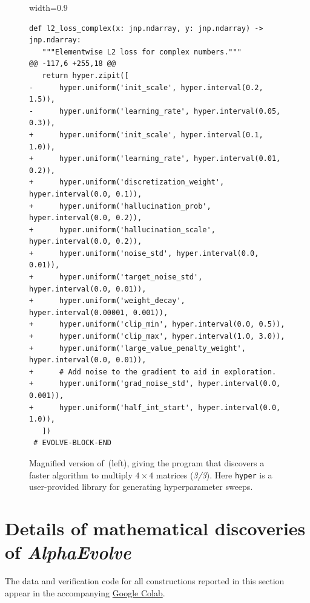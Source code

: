 \documentclass[logo,copyright,12pt]{googledeepmind}
\theoremstyle{definition}
\theoremstyle{remark}
\theoremstyle{plain}
\newcommand{\ResultsColabURL}{https://colab.research.google.com/github/google-deepmind/alphaevolve\_results/blob/master/mathematical\_results.ipynb}
\newcommand{\ResultsColab}{the accompanying \href{\ResultsColabURL}{Google Colab}}
\newcommand{\method}{\emph{AlphaEvolve}\xspace}
\begin{document}
\begin{figure}[p]
\begin{adjustbox}{width=0.9\textwidth}
\begin{minipage}{0.9\textwidth}
\begin{lstlisting}[style=pydiff, backgroundcolor=\color{backcolour}, firstnumber=131]
 def l2_loss_complex(x: jnp.ndarray, y: jnp.ndarray) -> jnp.ndarray:
   """Elementwise L2 loss for complex numbers."""
@@ -117,6 +255,18 @@
   return hyper.zipit([
-      hyper.uniform('init_scale', hyper.interval(0.2, 1.5)),
-      hyper.uniform('learning_rate', hyper.interval(0.05, 0.3)),
+      hyper.uniform('init_scale', hyper.interval(0.1, 1.0)),
+      hyper.uniform('learning_rate', hyper.interval(0.01, 0.2)),
+      hyper.uniform('discretization_weight', hyper.interval(0.0, 0.1)),
+      hyper.uniform('hallucination_prob', hyper.interval(0.0, 0.2)),
+      hyper.uniform('hallucination_scale', hyper.interval(0.0, 0.2)),
+      hyper.uniform('noise_std', hyper.interval(0.0, 0.01)),
+      hyper.uniform('target_noise_std', hyper.interval(0.0, 0.01)),
+      hyper.uniform('weight_decay', hyper.interval(0.00001, 0.001)),
+      hyper.uniform('clip_min', hyper.interval(0.0, 0.5)),
+      hyper.uniform('clip_max', hyper.interval(1.0, 3.0)),
+      hyper.uniform('large_value_penalty_weight', hyper.interval(0.0, 0.01)),
+      # Add noise to the gradient to aid in exploration.
+      hyper.uniform('grad_noise_std', hyper.interval(0.0, 0.001)),
+      hyper.uniform('half_int_start', hyper.interval(0.0, 1.0)),
   ])
 # EVOLVE-BLOCK-END
\end{lstlisting}
\end{minipage}
\end{adjustbox}
\caption{Magnified version of~(left), giving the program that discovers a faster algorithm to multiply $4\times4$ matrices  (\emph{3/3}). Here \texttt{hyper} is a user-provided library for generating hyperparameter sweeps.}\label{fig:relaxed-opt-diff-appendix-3}
\centering
\end{figure}


\clearpage
\section{Details of mathematical discoveries of \method}\label{app:maths}

The data and verification code for all constructions reported in this section appear in \ResultsColab.
\end{document}
